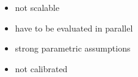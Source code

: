 \documentclass[preview]{standalone}
\begin{document}
\begin{center}
{\selectfont \begin{itemize} \begin{itemize}
        \item not scalable 
        \item have to be evaluated in parallel 
        \item strong parametric assumptions
        \item not calibrated 
        \end{itemize} \end{itemize}}
\end{center}
\end{document}
